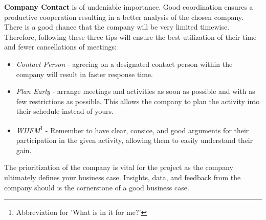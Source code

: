 \textbf{Company Contact} is of undeniable importance. Good coordination ensures a productive cooperation resulting in a better analysis of the chosen company.
\\
There is a good chance that the company will be very limited timewise. Therefore, following these three tips will ensure the best utilization of their time and fewer cancellations of meetings:
\begin{itemize}
	\item \textit{Contact Person} - agreeing on a designated contact person within the company will result in faster response time.
	\item \textit{Plan Early} - arrange meetings and activities as soon as possible and with as few restrictions as possible. This allows the company to plan the activity into their schedule instead of yours.
	\item \textit{WIIFM}\footnote{Abbreviation for 'What is in it for me?'} - Remember to have clear, consice, and good arguments for their participation in the given activity, allowing them to easily understand their gain.
\end{itemize}
The prioritization of the company is vital for the project as the company ultimately defines your business case. Insights, data, and feedback from the company should is the cornerstone of a good business case.